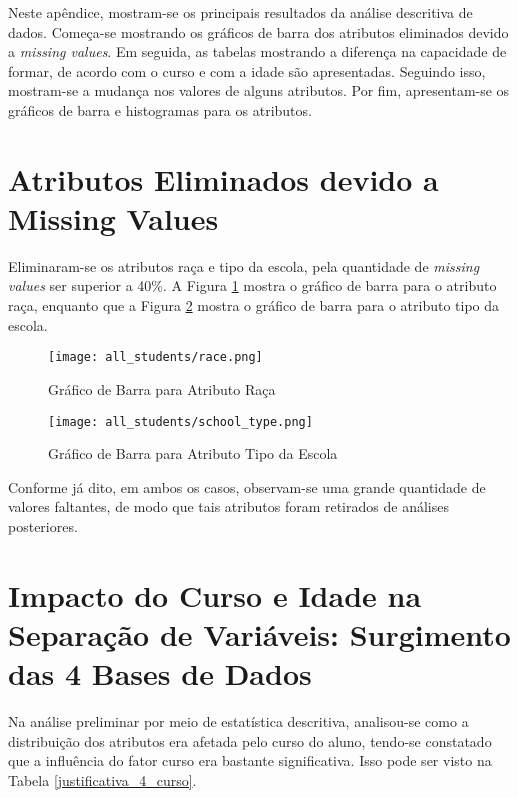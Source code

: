 Neste apêndice, mostram-se os principais resultados da análise descritiva de dados. 
Começa-se mostrando os gráficos de barra dos atributos eliminados devido a
\textit{missing values}. Em seguida, as tabelas mostrando a diferença na capacidade
de formar, de acordo com o curso e com a idade são apresentadas. Seguindo isso,
mostram-se a mudança nos valores de alguns atributos. Por fim, apresentam-se os
gráficos de barra e histogramas para os atributos. 

\section{Atributos Eliminados devido a Missing Values} \label{graf_miss_value}
\par Eliminaram-se os atributos raça e tipo da escola, pela quantidade de
\textit{missing values}
ser superior a 40\%.  A Figura \ref{atr_race} mostra o gráfico de barra para o
atributo raça, enquanto que a Figura \ref{atr_school_type} mostra o gráfico de barra
para o atributo tipo da escola.  
    \begin{figure}[!ht]
        \caption{Gráfico de Barra para Atributo Raça}
        \centering
        \texttt{[image: all\_students/race.png]}
        \label{atr_race}
    \end{figure}

    \begin{figure}[!ht]
        \caption{Gráfico de Barra para Atributo Tipo da Escola}
        \centering
        \texttt{[image: all\_students/school\_type.png]}
        \label{atr_school_type}
    \end{figure}

Conforme já dito, em ambos os casos, observam-se uma grande quantidade de valores
faltantes, de modo que tais atributos foram retirados de análises posteriores. 

\section{Impacto do Curso e Idade na Separação de Variáveis: Surgimento das 4 Bases
de Dados} \label{justificativa_4_base_dados}
Na análise preliminar por meio de estatística descritiva, analisou-se como a
distribuição dos atributos era afetada pelo curso do aluno, tendo-se constatado que a
influência do fator curso era bastante significativa. Isso pode ser visto na Tabela
\ref{justificativa_4_curso}.

